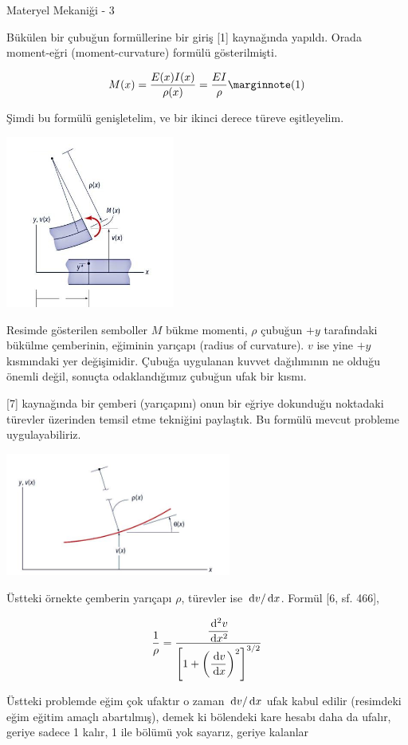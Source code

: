 \documentclass[12pt,fleqn]{article}\usepackage{../../common}
\begin{document}
Materyel Mekaniği - 3

Bükülen bir çubuğun formüllerine bir giriş [1] kaynağında yapıldı. Orada
moment-eğri (moment-curvature) formülü gösterilmişti.

$$
M(x) = \frac{E(x)I(x)}{\rho(x)} = \frac{EI}{\rho}
\mlabel{1}
$$

Şimdi bu formülü genişletelim, ve bir ikinci derece türeve eşitleyelim.

\includegraphics[width=15em]{phy_020_strs_05_01.jpg}

Resimde gösterilen semboller $M$ bükme momenti, $\rho$ çubuğun $+y$ tarafındaki
bükülme çemberinin, eğiminin yarıçapı (radius of curvature).  $v$ ise yine $+y$
kısmındaki yer değişimidir. Çubuğa uygulanan kuvvet dağılımının ne olduğu
önemli değil, sonuçta odaklandığımız çubuğun ufak bir kısmı.

[7] kaynağında bir çemberi (yarıçapını) onun bir eğriye dokunduğu noktadaki
türevler üzerinden temsil etme tekniğini paylaştık. Bu formülü mevcut probleme
uygulayabiliriz.

\includegraphics[width=20em]{phy_020_strs_05_02.jpg}

Üstteki örnekte çemberin yarıçapı $\rho$, türevler ise $\,\mathrm{d} v / \,\mathrm{d} x$.
Formül [6, sf. 466],

$$
\frac{1}{\rho} =
\frac
{\dfrac{\,\mathrm{d}^2 v}{\,\mathrm{d} x^2}}
{ \left[ 1 + \left( \dfrac{\,\mathrm{d} v}{\,\mathrm{d} x}  \right)^2 \right]^{3/2} }
$$

Üstteki problemde eğim çok ufaktır o zaman $\,\mathrm{d} v / \,\mathrm{d} x$ ufak kabul edilir
(resimdeki eğim eğitim amaçlı abartılmış), demek ki bölendeki kare hesabı
daha da ufalır, geriye sadece 1 kalır, 1 ile bölümü yok sayarız, geriye kalanlar
\end{document}
